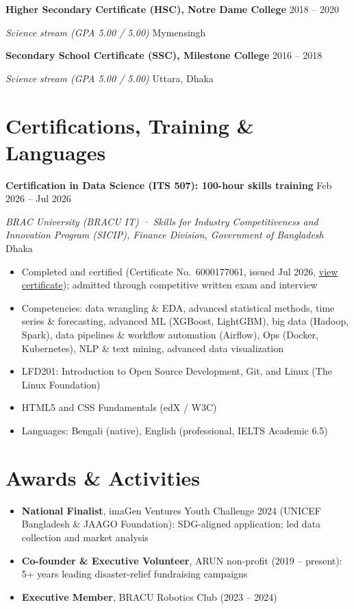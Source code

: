 \documentclass[11pt]{article}
\newcommand{\entry}[2]{\textbf{#1} \hfill {\small #2}\par}
\newcommand{\subentry}[2]{\textit{#1} \hfill {\small #2}\par}
\begin{document}
\entry{Higher Secondary Certificate (HSC), Notre Dame College}{2018 -- 2020}
\subentry{Science stream (GPA 5.00 / 5.00)}{Mymensingh}
\vspace{5pt}

\entry{Secondary School Certificate (SSC), Milestone College}{2016 -- 2018}
\subentry{Science stream (GPA 5.00 / 5.00)}{Uttara, Dhaka}

\section{Certifications, Training \& Languages}

\entry{Certification in Data Science (ITS 507): 100-hour skills training}{Feb 2026 -- Jul 2026}
\subentry{BRAC University (BRACU IT) · Skills for Industry Competitiveness and Innovation Program (SICIP), Finance Division, Government of Bangladesh}{Dhaka}
\begin{itemize}
  \item Completed and certified (Certificate No.\ 6000177061, issued Jul 2026, \href{https://drive.google.com/file/d/1-9hrKNT-oQfhBbvyeCV_-EAx9Td_T1Ql/view}{view certificate}); admitted through competitive written exam and interview
  \item Competencies: data wrangling \& EDA, advanced statistical methods, time series \& forecasting, advanced ML (XGBoost, LightGBM), big data (Hadoop, Spark), data pipelines \& workflow automation (Airflow), Ops (Docker, Kubernetes), NLP \& text mining, advanced data visualization
\end{itemize}
\vspace{5pt}

\begin{itemize}
  \item LFD201: Introduction to Open Source Development, Git, and Linux (The Linux Foundation)
  \item HTML5 and CSS Fundamentals (edX / W3C)
  \item Languages: Bengali (native), English (professional, IELTS Academic 6.5)
\end{itemize}

\section{Awards \& Activities}
\begin{itemize}
  \item \textbf{National Finalist}, imaGen Ventures Youth Challenge 2024 (UNICEF Bangladesh \& JAAGO Foundation): SDG-aligned application; led data collection and market analysis
  \item \textbf{Co-founder \& Executive Volunteer}, ARUN non-profit (2019 -- present): 5+ years leading disaster-relief fundraising campaigns
  \item \textbf{Executive Member}, BRACU Robotics Club (2023 -- 2024)
\end{itemize}
\end{document}
